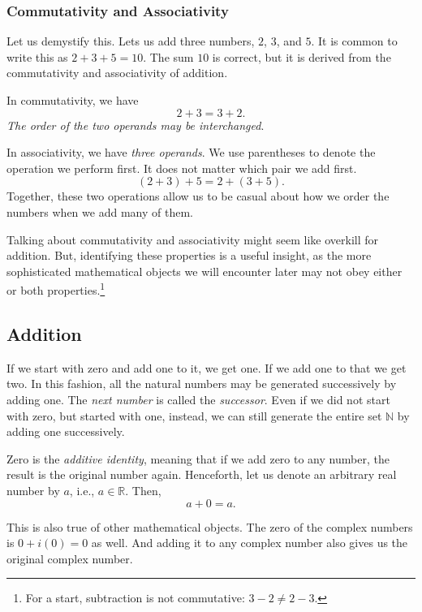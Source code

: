 \documentclass[
  a4paper,
]{article}
\begin{document}
\hypertarget{commutativity-and-associativity}{%
\subsubsection{Commutativity and
Associativity}\label{commutativity-and-associativity}}

Let us demystify this. Lets us add three numbers, \(2\), \(3\), and
\(5\). It is common to write this as \(2 + 3 + 5 = 10\). The sum \(10\)
is correct, but it is derived from the commutativity and associativity
of addition.

In commutativity, we have \[
2 + 3 = 3 + 2.
\] \emph{The order of the two operands may be interchanged}.

In associativity, we have \emph{three operands}. We use parentheses to
denote the operation we perform first. It does not matter which pair we
add first. \[
(2 + 3) + 5 = 2 + (3 + 5).
\] Together, these two operations allow us to be casual about how we
order the numbers when we add many of them.

Talking about commutativity and associativity might seem like overkill
for addition. But, identifying these properties is a useful insight, as
the more sophisticated mathematical objects we will encounter later may
not obey either or both properties.\footnote{For a start, subtraction is
  not commutative: \(3 - 2 \ne 2 - 3\).}

\hypertarget{addition}{%
\subsection{Addition}\label{addition}}

If we start with zero and add one to it, we get one. If we add one to
that we get two. In this fashion, all the natural numbers may be
generated successively by adding one. The \emph{next number} is called
the \emph{successor}. Even if we did not start with zero, but started
with one, instead, we can still generate the entire set \(\mathbb{N}\)
by adding one successively.

Zero is the \emph{additive identity}, meaning that if we add zero to any
number, the result is the original number again. Henceforth, let us
denote an arbitrary real number by \(a\), i.e., \(a \in \mathbb{R}\).
Then, \[
a + 0 = a.
\]

This is also true of other mathematical objects. The zero of the complex
numbers is \(0 + i(0) = 0\) as well. And adding it to any complex number
also gives us the original complex number.
\end{document}
